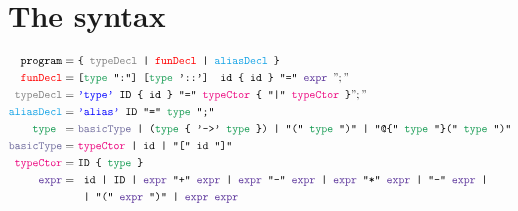 \documentclass{article}
\begin{document}
	\section{The syntax}
	\begin{align*}
	\texttt{program}  =\ & \texttt{\{ \color{gray}typeDecl \color{black} | \color{red}funDecl \color{black} | \color{Cerulean}aliasDecl \color{black} \}}\\
	\texttt{\color{red}funDecl\color{black}} =\ & \texttt{[\color{ForestGreen}type \color{black} ":"] [\color{ForestGreen}type \color{black} '::'] id \{ id \} "=" \color{RoyalPurple}expr \color{black}} ";"\\
	\texttt{\color{gray}typeDecl\color{black}} =\ &\texttt{\color{blue}'type' \color{black} ID \{ id \} "=" \color{RubineRed}typeCtor \color{black} \{ "|" \color{RubineRed}typeCtor \color{black} \}} ";"\\
	\texttt{\color{Cerulean}aliasDecl\color{black}} =\ &\texttt{\color{blue}'alias' \color{black} ID "=" \color{ForestGreen}type \color{black} ";"}\\
	\texttt{\color{ForestGreen}type \color{black}} =\ &\texttt{\color{CadetBlue}basicType \color{black} | (\color{ForestGreen}type \color{black} \{ '->' \color{ForestGreen}type \color{black} \}) | "(" \color{ForestGreen}type \color{black} ")" | "@\{" \color{ForestGreen}type \color{black} "\}(" \color{ForestGreen}type \color{black} ")"}\\
	\texttt{\color{CadetBlue}basicType} =\ &	\texttt{\color{RubineRed}typeCtor \color{black}| id | "[" id "]"}\\
	\texttt{\color{RubineRed}typeCtor\color{black}} =\ & \texttt{ID \{ \color{ForestGreen}type \color{black} \}}\\
	\texttt{\color{RoyalPurple}expr\color{black}} =\ &  \texttt{
		id
		| ID
		| \color{RoyalPurple}expr \color{black} "+" \color{RoyalPurple}expr \color{black} 
		| \color{RoyalPurple}expr \color{black} "-" \color{RoyalPurple}expr \color{black} 
		| \color{RoyalPurple}expr \color{black} "*" \color{RoyalPurple}expr \color{black}
		| "-" \color{RoyalPurple}expr \color{black}
		|}\\
	&\texttt{
		| "(" \color{RoyalPurple}expr \color{black} ")" 
		| \color{RoyalPurple}expr \color{black} \color{RoyalPurple}expr \color{black} 
}
\end{align*}
\end{document}
